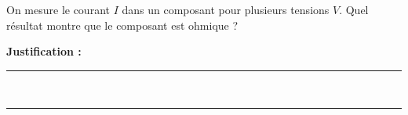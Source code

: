 On mesure le courant $I$ dans un composant pour plusieurs tensions $V$. Quel résultat montre que le composant est ohmique ?

\choices

\noindent\textbf{Justification :} \hrulefill \\[2.5ex]
\rule{\linewidth}{0.4pt} \\[2.5ex]
\rule{\linewidth}{0.4pt}
\vfill
